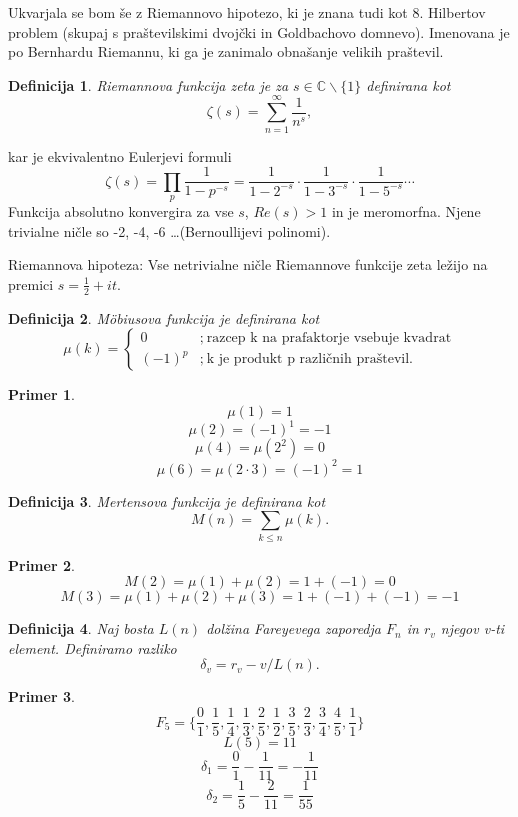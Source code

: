 \documentclass[a4paper,9pt]{article}
\newtheorem{definicija}{Definicija}
\newtheorem{primer}{Primer}
\begin{document}
Ukvarjala se bom še z Riemannovo hipotezo, ki je znana tudi kot 8. Hilbertov problem (skupaj s praštevilskimi dvojčki in Goldbachovo domnevo). Imenovana je po Bernhardu Riemannu, ki ga je zanimalo obnašanje velikih praštevil.

\begin{definicija}
Riemannova funkcija zeta je za
 $s\in\mathbb{C}\backslash\{1\}$
definirana kot
\[ \zeta(s) = \sum_{n=1}^{\infty}\frac{1}{n^s}, \]
\end{definicija}

kar je ekvivalentno Eulerjevi formuli
\[ \zeta(s) = \prod_{p}\frac{1}{1-p^{-s}}=\frac{1}{1-2^{-s}}\cdot\frac{1}{1-3^{-s}}\cdot\frac{1}{1-5^{-s}}\cdots \]
Funkcija absolutno konvergira za vse $s$, $Re(s)>1$ in je meromorfna. Njene trivialne ničle so -2, -4, -6 \ldots (Bernoullijevi polinomi).

Riemannova hipoteza: Vse netrivialne ničle Riemannove funkcije zeta ležijo na premici $s=\frac{1}{2}+it$.

\begin{definicija}
M\"obiusova funkcija je definirana kot
\[
\mu(k) = \left\{
\begin{array}{rl}
0 & ;\ \mbox{razcep k na prafaktorje vsebuje kvadrat}\\
(-1)^p & ;\  \mbox{k je produkt p različnih praštevil.}
\end{array}
\right.
\]
\end{definicija}

\begin{primer}
\[ \mu(1)=1 \]
\[ \mu(2)=(-1)^{1}=-1 \]
\[ \mu(4)=\mu(2^{2})=0 \]
\[ \mu(6)=\mu(2\cdot3)=(-1)^{2}=1 \]
\end{primer}

\begin{definicija}
Mertensova funkcija je definirana kot
\[ M(n)=\sum_{k\leq n}\mu(k).\]
\end{definicija}

\begin{primer}
\[ M(2)=\mu(1)+\mu(2)=1+(-1)=0 \]
\[ M(3)=\mu(1)+\mu(2)+\mu(3)=1+(-1)+(-1)=-1 \]
\end{primer}

\begin{definicija}
Naj bosta $L(n)$ dolžina Fareyevega zaporedja $F_{n}$ in $r_{v}$ njegov v-ti element. Definiramo razliko
\[ \delta_{v}= r_{v}-v/L(n). \]
\end{definicija}

\begin{primer}
\[ F_5 = \{\frac{0}{1}, \frac{1}{5}, \frac{1}{4}, \frac{1}{3}, \frac{2}{5}, \frac{1}{2}, \frac{3}{5}, \frac{2}{3}, \frac{3}{4}, \frac{4}{5}, \frac{1}{1}\} \]
\[ L(5) = 11 \]
\[ \delta_{1} = \frac{0}{1} - \frac{1}{11} = -\frac{1}{11} \]
\[ \delta_{2} = \frac{1}{5} - \frac{2}{11} = \frac{1}{55} \]
\end{primer}
\end{document}
